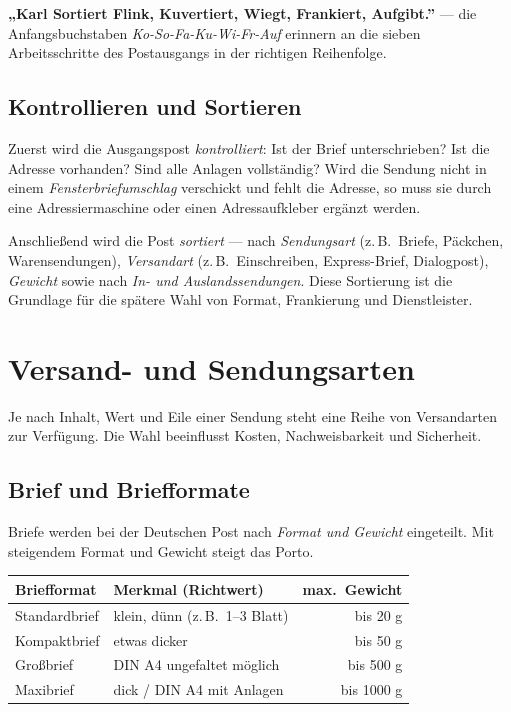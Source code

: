 \documentclass[11pt, a4paper]{article}
\begin{document}
\begin{eselsbruecke}
\textbf{„Karl Sortiert Flink, Kuvertiert, Wiegt, Frankiert, Aufgibt.”} --- die Anfangs\-buch\-staben
\emph{Ko-So-Fa-Ku-Wi-Fr-Auf} erinnern an die sieben Arbeitsschritte des Postausgangs in
der richtigen Reihenfolge.
\end{eselsbruecke}

\subsection{Kontrollieren und Sortieren}

Zuerst wird die Ausgangspost \emph{kontrolliert}: Ist der Brief unterschrieben? Ist die
Adresse vorhanden? Sind alle Anlagen vollständig? Wird die Sendung nicht in einem
\emph{Fensterbriefumschlag} verschickt und fehlt die Adresse, so muss sie durch eine
Adressiermaschine oder einen Adressaufkleber ergänzt werden.

Anschließend wird die Post \emph{sortiert} --- nach \emph{Sendungsart} (z.\,B.\ Briefe,
Päckchen, Warensendungen), \emph{Versandart} (z.\,B.\ Einschreiben, Express-Brief,
Dialogpost), \emph{Gewicht} sowie nach \emph{In- und Auslandssendungen}. Diese Sortierung
ist die Grundlage für die spätere Wahl von Format, Frankierung und Dienstleister.

\section{Versand- und Sendungsarten}

Je nach Inhalt, Wert und Eile einer Sendung steht eine Reihe von Versandarten zur
Verfügung. Die Wahl beeinflusst Kosten, Nachweisbarkeit und Sicherheit.

\subsection{Brief und Briefformate}

Briefe werden bei der Deutschen Post nach \emph{Format und Gewicht} eingeteilt. Mit
steigendem Format und Gewicht steigt das Porto.

\begin{center}
\begin{tabular}{p{3cm} p{4.5cm} r}
\toprule
\textbf{Briefformat} & \textbf{Merkmal (Richtwert)} & \textbf{max.\ Gewicht}\\
\midrule
Standardbrief & klein, dünn (z.\,B.\ 1--3 Blatt) & bis 20 g\\
Kompaktbrief & etwas dicker & bis 50 g\\
Großbrief & DIN A4 ungefaltet möglich & bis 500 g\\
Maxibrief & dick / DIN A4 mit Anlagen & bis 1000 g\\
\bottomrule
\end{tabular}
\end{center}
\end{document}
